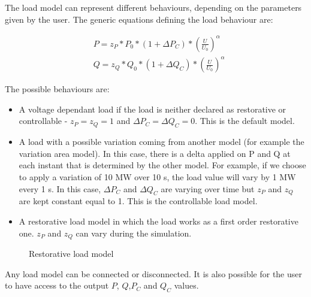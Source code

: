 \documentclass[a4paper, 12pt]{report}
\begin{document}
The load model can represent different behaviours, depending on the parameters given by the user. The generic equations defining the load behaviour are:

\begin{equation}
\begin{aligned}
& P = z_{P} * P_{0} * (1 + \Delta P_{C}) * (\frac{U}{U_{0}})^\alpha \\
& Q = z_{Q} * Q_{0} * (1 + \Delta Q_{C}) * (\frac{U}{U_{0}})^\alpha
\end{aligned}
\label{Load model}
\end{equation}

The possible behaviours are:
\begin{itemize}
\item A voltage dependant load if the load is neither declared as restorative or controllable - $z_{P} = z_{Q} = 1$ and $\Delta P_{C} = \Delta Q_{C} = 0 $. This is the default model.
\item A load with a possible variation coming from another model (for example the variation area model). In this case, there is a delta applied on P and Q at each instant that is determined by the other model. For example, if we choose to apply a variation of 10 MW over 10 s, the load value will vary by 1 MW every 1 s. In this case, $\Delta P_{C}$ and $\Delta Q_{C}$ are varying over time but $z_{P}$ and $z_{Q}$ are kept constant equal to 1. This is the controllable load model.
\item A restorative load model in which the load works as a first order restorative one. $z_{P}$ and $z_{Q}$ can vary during the simulation.
\end{itemize}

\begin{figure}[h]
  \setlength{\abovecaptionskip}{15pt}
\centering
\caption{Restorative load model}
\end{figure}

Any load model can be connected or disconnected. It is also possible for the user to have access to the output $P$, $Q$,$ P_C$ and $Q_C$ values. \\
\end{document}
